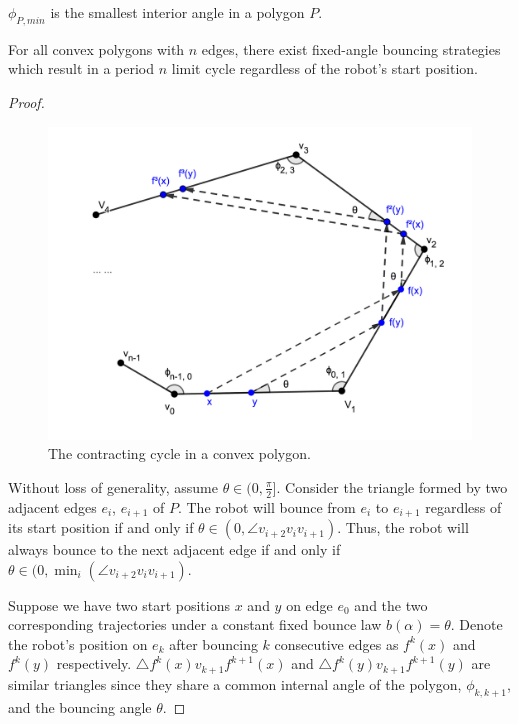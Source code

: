 \documentclass[]{styles/svproc}  %
\begin{document}

\begin{definition}
$\phi_{P,min}$ is the smallest interior angle in a polygon $P$.
\end{definition}

\begin{theorem} \label{thm:convex}
For all convex polygons with $n$ edges, there exist fixed-angle bouncing
strategies which result in a period $n$ limit cycle regardless of the robot's start position.
\end{theorem}
\begin{proof}
\begin{figure}
    \includegraphics[width=0.6\linewidth]{figures/convex_cycle.png}
    \centering
    \caption{The contracting cycle in a convex polygon.\label{fig:conv_cycle}}
    \centering
\end{figure}
Without loss of generality, assume $\theta \in (0, \frac{\pi}{2}]$. Consider the
triangle formed by two adjacent edges $e_i$, $e_{i+1}$ of $P$. The robot will
bounce from $e_i$ to $e_{i+1}$ regardless of its start position if and only if
$\theta \in (0, \angle v_{i+2}v_{i}v_{i+1})$. Thus, the robot will always bounce
to the next adjacent edge if and only if
$\theta \in (0, \min_{i}(\angle v_{i+2}v_{i}v_{i+1})$.

Suppose we have two start positions $x$ and $y$ on edge $e_0$ and the two
corresponding trajectories under a constant fixed bounce law $b(\alpha) = \theta$. Denote the robot's
position on $e_k$ after bouncing $k$ consecutive edges as $f^{k}(x)$ and
$f^{k}(y)$ respectively. $\triangle f^{k}(x)v_{k+1}f^{k+1}(x)$ and
$\triangle f^{k}(y)v_{k+1}f^{k+1}(y)$ are similar triangles since they share a
common internal angle of the polygon, $\phi_{k,k+1}$, and the bouncing angle
$\theta$.


\end{proof}
\end{document}
